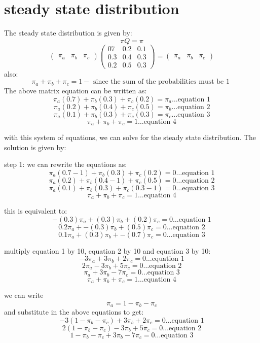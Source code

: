 \documentclass{article}
\begin{document}
\section{steady state distribution}
The steady state distribution is given by:
\[\pi Q= \pi\]
\[\begin{pmatrix}
\pi_a & \pi_b & \pi_c
\end{pmatrix}\begin{pmatrix}07 & 0.2 & 0.1 \\ 0.3 & 0.4 & 0.3 \\ 0.2 & 0.5 & 0.3\end{pmatrix} = \begin{pmatrix} \pi_a & \pi_b & \pi_c \end{pmatrix}\]
also:
\[\pi_a + \pi_b + \pi_c = 1 -\text{ since the sum of the probabilities must be 1 }\]
The  above matrix equation can be written as:
\[\pi_a(0.7) + \pi_b(0.3) + \pi_c(0.2) = \pi_a \ldots \text{equation 1}\]
\[\pi_a(0.2) + \pi_b(0.4) + \pi_c(0.5) = \pi_b \ldots\text{equation 2}\]
\[\pi_a(0.1) + \pi_b(0.3) + \pi_c(0.3) = \pi_c \ldots\text{equation 3}\]
\[\pi_a + \pi_b + \pi_c = 1 \ldots\text{equation 4}\]

with this system of equations, we can solve for the steady state distribution. The solution is given by:

step 1: we can rewrite the equations as:
\[\pi_a(0.7 - 1) + \pi_b(0.3) + \pi_c(0.2) = 0 \ldots\text{equation 1}\]
\[\pi_a(0.2) + \pi_b(0.4 - 1) + \pi_c(0.5) = 0 \ldots\text{equation 2}\]
\[\pi_a(0.1) + \pi_b(0.3) + \pi_c(0.3 - 1) = 0 \ldots\text{equation 3}\]
\[\pi_a + \pi_b + \pi_c = 1 \ldots\text{equation 4}\]

this is equivalent to:
\[-(0.3)\pi_a + (0.3)\pi_b + (0.2)\pi_c = 0 \ldots\text{equation 1}\]
\[0.2\pi_a + -(0.3)\pi_b + (0.5)\pi_c = 0 \ldots\text{equation 2}\]
\[0.1\pi_a + (0.3)\pi_b + -(0.7)\pi_c = 0 \ldots\text{equation 3}\]

multiply equation 1 by 10, equation 2 by 10 and equation 3 by 10:
\[-3\pi_a + 3\pi_b + 2\pi_c = 0 \ldots\text{equation 1}\]
\[2\pi_a - 3\pi_b + 5\pi_c = 0 \ldots\text{equation 2}\]
\[\pi_a + 3\pi_b - 7\pi_c = 0 \ldots\text{equation 3}\]
\[\pi_a + \pi_b + \pi_c = 1 \ldots\text{equation 4}\]

we can write \[\pi_a = 1 - \pi_b - \pi_c\] and substitute in the above equations to get:
\[-3(1 - \pi_b - \pi_c) + 3\pi_b + 2\pi_c = 0 \ldots\text{equation 1}\]
\[2(1 - \pi_b - \pi_c) - 3\pi_b + 5\pi_c = 0 \ldots\text{equation 2}\]
\[1 - \pi_b - \pi_c + 3\pi_b - 7\pi_c = 0 \ldots\text{equation 3}\]
\end{document}
